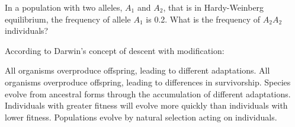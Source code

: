 \question
In a population with two alleles, $A_1$ and $A_2$, that is in Hardy-Weinberg equilibrium, the frequency of allele $A_1$ is 0.2. What is the frequency of $A_2A_2$ individuals? 

\begin{choices}
\end{choices}

\newpage

\question
According to Darwin's concept of descent with modification:

\begin{choices}
\choice All organisms overproduce offspring, leading to different adaptations. 
\choice All organisms overproduce offspring, leading to differences in survivorship. 
\correctchoice Species evolve from ancestral forms through the accumulation of different adaptations. 
\choice Individuals with greater fitness will evolve more quickly than individuals with lower fitness. 
\choice Populations evolve by natural selection acting on individuals. 
\end{choices}

